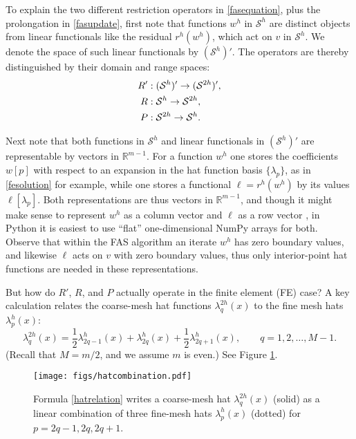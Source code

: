 \documentclass[letterpaper,final,12pt,reqno]{amsart}
\newcommand{\RR}{\mathbb{R}}
\begin{document}
To explain the two different restriction operators in \eqref{fasequation}, plus the prolongation in \eqref{fasupdate}, first note that functions $w^h$ in $\mathcal{S}^h$ are distinct objects from linear functionals like the residual $r^h(w^h)$, which act on $v$ in $\mathcal{S}^h$.  We denote the space of such linear functionals by $(\mathcal{S}^h)'$.  The operators are thereby distinguished by their domain and range spaces:
\begin{align}
  R' &: (\mathcal{S}^h)' \to (\mathcal{S}^{2h})', \label{rpoperators} \\
  R  &: \mathcal{S}^h \to \mathcal{S}^{2h}, \notag \\
  P  &: \mathcal{S}^{2h} \to \mathcal{S}^h. \notag
\end{align}

Next note that both functions in $\mathcal{S}^h$ and linear functionals in $(\mathcal{S}^h)'$ are representable by vectors in $\RR^{m-1}$.  For a function $w^h$ one stores the coefficients $w[p]$ with respect to an expansion in the hat function basis $\{\lambda_p\}$, as in \eqref{fesolution} for example, while one stores a functional $\ell=r^h(w^h)$ by its values $\ell[\lambda_p]$.  Both representations are thus vectors in $\RR^{m-1}$, and though it might make sense to represent $w^h$ as a column vector and $\ell$ as a row vector \cite{TrefethenBau1997}, in Python it is easiest to use ``flat'' one-dimensional NumPy arrays for both.  Observe that within the FAS algorithm an iterate $w^h$ has zero boundary values, and likewise $\ell$ acts on $v$ with zero boundary values, thus only interior-point hat functions are needed in these representations.

But how do $R'$, $R$, and $P$ actually operate in the finite element (FE) case?  A key calculation relates the coarse-mesh hat functions $\lambda_q^{2h}(x)$ to the fine mesh hats $\lambda_p^h(x)$:
\begin{equation}
  \lambda_q^{2h}(x) = \frac{1}{2} \lambda_{2q-1}^h(x) + \lambda_{2q}^h(x) + \frac{1}{2} \lambda_{2q+1}^h(x), \qquad q=1,2,\dots,M-1. \label{hatrelation}
\end{equation}
(Recall that $M=m/2$, and we assume $m$ is even.)  See Figure \ref{fig:hatcombination}.

\begin{figure}
\texttt{[image: figs/hatcombination.pdf]}
\caption{Formula \eqref{hatrelation} writes a coarse-mesh hat $\lambda_q^{2h}(x)$ (solid) as a linear combination of three fine-mesh hats $\lambda_p^h(x)$ (dotted) for $p=2q-1,2q,2q+1$.}
\label{fig:hatcombination}
\end{figure}
\end{document}
